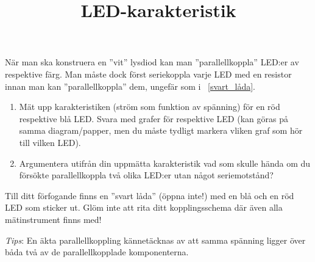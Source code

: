 \documentclass[12pt,a4paper]{article}
\newcommand{\figref}{\MakeLowercase{\figurename}~\ref}
\begin{document}
\title{LED-karakteristik}
\author{}
\date{}
\maketitle



När man ska konstruera en ''vit'' lysdiod kan man ''parallellkoppla''
LED:er av respektive färg. Man måste dock först seriekoppla varje LED
med en resistor innan man kan ''parallellkoppla'' dem, ungefär som i
\figref{svart_låda}.  

\begin{enumerate}
\item Mät upp karakteristiken (ström som funktion av
spänning) för en röd respektive blå LED. Svara med grafer för
respektive LED (kan göras på samma diagram/papper, men du måste
tydligt markera vliken graf som hör till vilken LED).
\item Argumentera utifrån din uppmätta karakteristik vad som skulle
  hända om du försökte parallellkoppla två olika LED:er utan något
  seriemotstånd? 
\end{enumerate}
Till ditt förfogande finns en
''svart låda'' (öppna inte!) med en blå och en röd LED som sticker ut. 
Glöm inte att rita ditt kopplingsschema där även alla mätinstrument
finns med!

\emph{Tips}: En äkta parallellkoppling kännetäcknas av att samma
spänning ligger över båda två av de parallellkopplade komponenterna. 



% 
\end{document}
